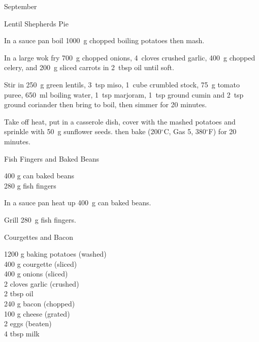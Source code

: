 \begin{menu}{September}
\begin{recipe}{2}{Lentil Shepherds Pie}
    \begin{instructions}
    \item 
        In a sauce pan boil
        1000~g chopped boiling potatoes
        then mash.
      \item 
        In a large wok fry
        700~g chopped onions,
        4~cloves crushed garlic,
        400~g chopped celery,
        and
        200~g sliced carrots
        in
        2~tbsp  oil
        until soft.
      \item 
        Stir in
        250~g  green lentils,
        3~tsp  miso,
        1~cube crumbled stock,
        75~g  tomato puree,
        650~ml  boiling water,
        1~tsp  marjoram,
        1~tsp  ground cumin
        and
        2~tsp  ground coriander
        then bring to boil,
        then simmer for 20 minutes.
      \item 
        Take off heat,
        put in a casserole dish,
        cover with the mashed potatoes
        and sprinkle with
        50~g  sunflower seeds.
        then bake (200$^{\circ}$C, Gas 5, 380$^{\circ}$F) for 20 minutes.
      
    \end{instructions}
    \end{recipe}%
  
    \begin{recipe}{1}{Fish Fingers and Baked Beans}%
		\begin{ingredients}
		400 g can baked beans  \\
	280 g fish fingers  \\
	
		\end{ingredients}
	
    \begin{instructions}
    \item 
        In a sauce pan heat up
        400~g  can baked beans.
      \item 
        Grill
        280~g  fish fingers.
      
    \end{instructions}
    \end{recipe}%
  
    \begin{recipe}{2}{Courgettes and Bacon}%
		\begin{ingredients}
		1200 g baking potatoes (washed) \\
	400 g courgette (sliced) \\
	400 g onions (sliced) \\
	2 cloves garlic (crushed) \\
	2 tbsp oil  \\
	240 g bacon (chopped) \\
	100 g cheese (grated) \\
	2  eggs (beaten) \\
	4 tbsp milk  \\
	

\end{ingredients}
\end{recipe}
\end{menu}
